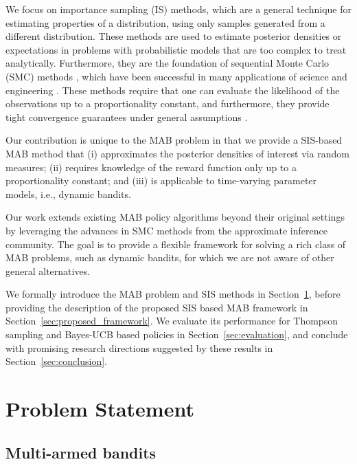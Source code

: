 \documentclass{article}
\newcommand{\ie}{i.e., }
\begin{document}
We focus on importance sampling (IS) methods, which are a general technique for estimating properties of a distribution, using only samples generated from a different distribution. These methods are used to estimate posterior densities or expectations in problems with probabilistic models that are too complex to treat analytically. Furthermore, they are the foundation of sequential Monte Carlo (SMC) methods \cite{j-Arulampalam2002,b-Doucet2001,j-Djuric2003}, which have been successful in many applications of science and engineering \cite{b-Ristic2004,j-Leeuwen2009,j-Ionides2006,j-Creal2012}. These methods require that one can evaluate the likelihood of the observations up to a proportionality constant, and furthermore, they provide tight convergence guarantees under general assumptions \cite{j-Crisan2002,j-Chopin2004}.

Our contribution is unique to the MAB problem in that we provide a SIS-based MAB method that (i) approximates the posterior densities of interest via random measures; (ii) requires knowledge of the reward function only up to a proportionality constant; and (iii) is applicable to time-varying parameter models, \ie dynamic bandits. 

Our work extends existing MAB policy algorithms beyond their original settings by leveraging the advances in SMC methods from the approximate inference community. The goal is to provide a flexible framework for solving a rich class of MAB problems, such as dynamic bandits, for which we are not aware of other general alternatives.

We formally introduce the MAB problem and SIS methods in Section~\ref{sec:problem_statement}, before providing the description of the proposed SIS based MAB framework in Section~\ref{sec:proposed_framework}. We evaluate its performance for Thompson sampling and Bayes-UCB based policies in Section~\ref{sec:evaluation}, and conclude with promising research directions suggested by these results in Section~\ref{sec:conclusion}.

\section{Problem Statement}
\label{sec:problem_statement}

\subsection{Multi-armed bandits}
\label{ssec:problem_statement_mab}
\end{document}
